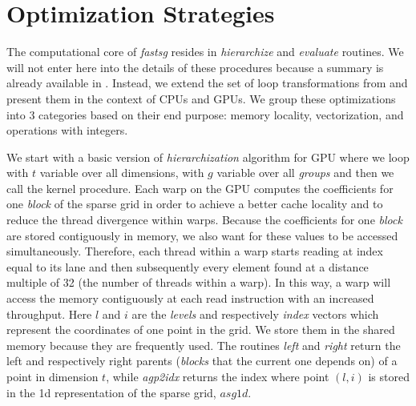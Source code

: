 \section{Optimization Strategies}
\label{sec:op_strategies}

The computational core of \textit{fastsg} resides in \textit{hierarchize} and
\textit{evaluate} routines. We will not enter here into the details of these
procedures because a summary is already available in \cite{murarasu2011}.
Instead, we extend the set of loop transformations from \cite{murarasu2012} and
present them in the context of CPUs and GPUs. We group these optimizations into
3 categories based on their end purpose: memory locality, vectorization, and
operations with integers.

We start with a basic version of \textit{hierarchization} algorithm for GPU
where we loop with $t$ variable over all dimensions, with $g$ variable over all
\textit{groups} and then we call the kernel procedure. Each warp on the GPU
computes the coefficients for one \textit{block} of the sparse grid in order to
achieve a better cache locality and to reduce the thread divergence within
warps. Because the coefficients for one \textit{block} are stored contiguously
in memory, we also want for these values to be accessed simultaneously.
Therefore, each thread within a warp starts reading at index equal to its lane
and then subsequently every element found at a distance multiple of 32 (the
number of threads within a warp). In this way, a warp will access the memory
contiguously at each read instruction with an increased throughput. Here $l$ and
$i$ are the \textit{levels} and respectively \textit{index} vectors which
represent the coordinates of one point in the grid. We store them in the shared
memory because they are frequently used. The routines \textit{left} and
\textit{right} return the left and respectively right parents (\textit{blocks}
that the current one depends on) of a point in dimension $t$, while
\textit{agp2idx} returns the index where point $(l, i)$ is stored in the 1d
representation of the sparse grid, $asg1d$.

